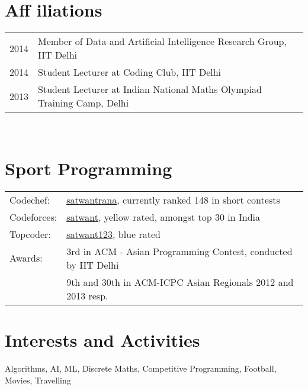 \documentclass[a4paper,10pt]{article} %
\begin{document}

\section{Aff iliations}
\begin{tabular}{rl}
2014 & Member of Data and Artificial Intelligence Research Group, IIT Delhi \\
2014 & Student Lecturer at Coding Club, IIT Delhi\\
2013 & Student Lecturer at Indian National Maths Olympiad Training Camp, Delhi
\end{tabular}\\




\section{Sport Programming}

\begin{tabular}{ll}
Codechef: & \href{http://www.codechef.com/users/satwantrana}{satwantrana}, currently ranked 148 in short contests\\
Codeforces: & \href{http://codeforces.com/profile/satwant}{satwant}, yellow rated, amongst top 30 in India\\
Topcoder: & \href{http://community.topcoder.com/tc?module=MemberProfile&cr=23152984}{satwant123}, blue rated\\
Awards: & 3rd in ACM - Asian Programming Contest, conducted by IIT Delhi\\
& 9th and 30th in ACM-ICPC Asian Regionals 2012 and 2013 resp.

\end{tabular}



\section{Interests and Activities}

Algorithms, AI, ML, Discrete Maths, Competitive Programming, Football, Movies, Travelling
\end{document}
